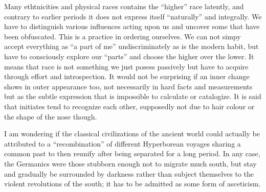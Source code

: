 \begin{footnotesize}
\begin{sffamily}
Many ethtnicities and physical races contains the ``higher'' race latently, and contrary to earlier periods it does not express itself ``naturally'' and integrally. We have to distinguish various influences acting upon us and uncover some that have been obfuscated. This is a practice in ordering ourselves. We can not simpy accept everything as ``a part of me'' undiscriminately as is the modern habit, but have to consciously explore our ``parts'' and choose the higher over the lower. It means that race is not something we just posess passively but have to acquire through effort and introspection. It would not be surprising if an inner change shows in outer appearance too, not necessarily in hard facts and measurements but as the subtle expression that is impossible to calculate or catalogize. It is said that initiates tend to recognize each other, supposedly not due to hair colour or the shape of the nose though.

I am wondering if the classical civilizations of the ancient world could actually be attributed to a ``recombination'' of different Hyperborean voyages sharing a common past to then reunify after being separated for a long period. In any case, the Germanics were those stubborn enough not to migrate much south, but stay and gradually be surrounded by darkness rather than subject themselves to the violent revolutions of the south; it has to be admitted as some form of asceticism.

\end{sffamily}
\end{footnotesize}


